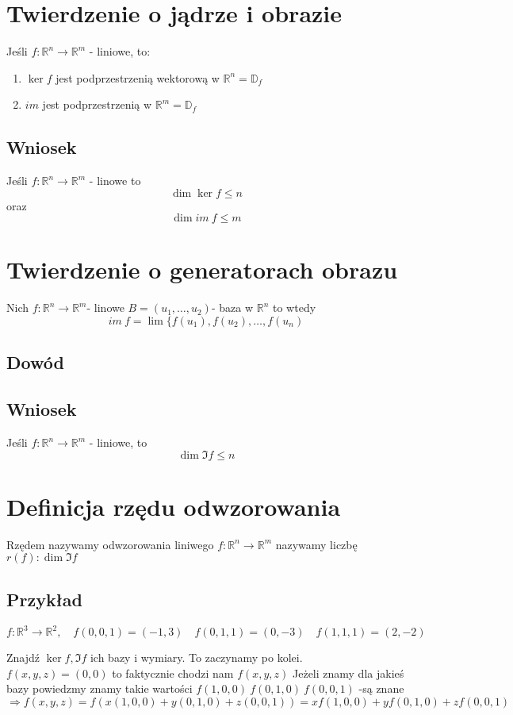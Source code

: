 \documentclass[11pt]{article}
\begin{document}
\section{Twierdzenie o jądrze i obrazie}
Jeśli $f : \mathbb{R}^n \to \mathbb{R}^m$ - liniowe, to:
\begin{enumerate}
\item{$\ker{f}$ jest podprzestrzenią wektorową w $\mathbb{R}^n = \mathbb{D}_{f}$}
\item{$im$ jest podprzestrzenią w  $\mathbb{R}^m = \mathbb{D}_{f}$}
\end{enumerate}
\subsection{Wniosek}
Jeśli $f:\mathbb{R}^n \to \mathbb{R}^m$ - linowe to
$$\dim{\ker{f}} \leq n$$ oraz $$ \dim{im\ f} \leq m$$
\section{Twierdzenie o generatorach obrazu}
Nich $f: \mathbb{R}^n \to \mathbb{R}^m$- linowe $B = (u_1,\ldots, u_2)$- baza w $\mathbb{R}^n$ to wtedy
$$ im\ f = \lim{\{f(u_1),f(u_2),\ldots,f(u_n)}$$
\subsection{Dowód} 
\subsection{Wniosek}
Jeśli $f:\mathbb{R}^n \to \mathbb{R}^m$ - liniowe, to $$\dim{ \Im{f}} \leq n$$
\section{Definicja rzędu odwzorowania}
Rzędem nazywamy odwzorowania liniwego $f:\mathbb{R}^n \to \mathbb{R}^m$ nazywamy liczbę $r(f) : \dim{ \Im{f}}$

\subsection{Przykład}
$f: \mathbb{R}^3 \to \mathbb{R}^2, \quad f(0,0,1) = (-1,3) \quad f(0,1,1) = (0,-3) \quad f(1,1,1) = (2,-2)$

Znajdź $\ker{f}, \Im{f}$ ich bazy i wymiary.
To zaczynamy po kolei.
$f(x,y,z) = (0,0)$ to faktycznie chodzi nam $f(x,y,z)$
Jeżeli znamy dla jakieś bazy powiedzmy znamy takie wartości $f(1,0,0)\ f(0,1,0)\ f(0,0,1)$ -są znane $\Rightarrow f(x,y,z) = f(x(1,0,0) + y(0,1,0) + z(0,0,1)) = xf(1,0,0) + yf(0,1,0) + zf(0,0,1)$
\end{document}
